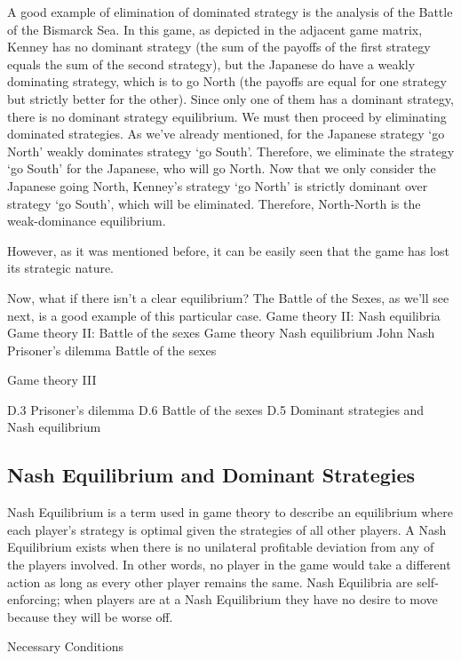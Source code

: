 A good example of elimination of dominated strategy is the analysis of the Battle of the Bismarck Sea. In this game, as depicted in the adjacent game matrix, Kenney has no dominant strategy (the sum of the payoffs of the first strategy equals the sum of the second strategy), but the Japanese do have a weakly dominating strategy, which is to go North (the payoffs are equal for one strategy but strictly better for the other). Since only one of them has a dominant strategy, there is no dominant strategy equilibrium. We must then proceed by eliminating dominated strategies. As we’ve already mentioned, for the Japanese strategy ‘go North’ weakly dominates strategy ‘go South’. Therefore, we eliminate the strategy ‘go South’ for the Japanese, who will go North. Now that we only consider the Japanese going North, Kenney’s strategy ‘go North’ is strictly dominant over strategy ‘go South’, which will be eliminated. Therefore, North-North is the weak-dominance equilibrium.

However, as it was mentioned before, it can be easily seen that the game has lost its strategic nature.

Now, what if there isn’t a clear equilibrium? The Battle of the Sexes, as we’ll see next, is a good example of this particular case.
	Game theory II: Nash equilibria Game theory II: Battle of the sexes 
Game theory
Nash equilibrium
John Nash
Prisoner’s dilemma
Battle of the sexes
 
Game theory III
 
D.3 Prisoner’s dilemma
D.6 Battle of the sexes
D.5 Dominant strategies and Nash equilibrium



\subsection{Nash Equilibrium and Dominant Strategies}

Nash Equilibrium is a term used in game theory to describe an equilibrium where each player's strategy is optimal given the strategies of all other players. A Nash Equilibrium exists when there is no unilateral profitable deviation from any of the players involved. In other words, no player in the game would take a different action as long as every other player remains the same. Nash Equilibria are self-enforcing; when players are at a Nash Equilibrium they have no desire to move because they will be worse off.

Necessary Conditions

